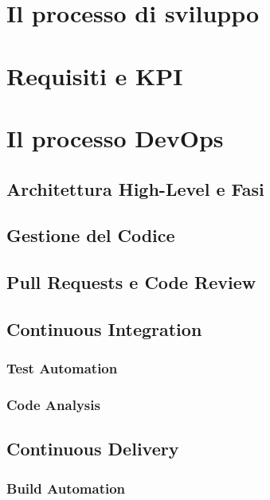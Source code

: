 \documentclass[a4paper,12pt]{report}
\begin{document}
	\section{Il processo di sviluppo}
	
	\section{Requisiti e KPI}
	
	\section{Il processo DevOps}
	
	\subsection{Architettura High-Level e Fasi}
	
	\subsection{Gestione del Codice}
	
	\subsection{Pull Requests e Code Review}
	
	\subsection{Continuous Integration}
	
	\subsubsection{Test Automation}
	
	\subsubsection{Code Analysis}
	
	\subsection{Continuous Delivery}
	
	\subsubsection{Build Automation}
	
\end{document}
